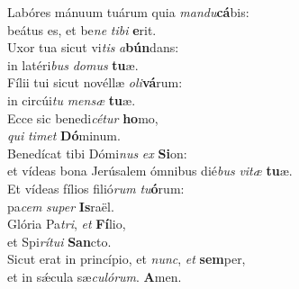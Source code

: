\evenverse Labóres mánuum tuárum quia \textit{man}\textit{du}\textbf{cá}bis:~\*\\
\evenverse beátus es, et be\textit{ne} \textit{ti}\textit{bi} \textbf{e}rit.\\
\oddverse Uxor tua sicut vi\textit{tis} \textit{a}\textbf{bún}dans:~\*\\
\oddverse in latéri\textit{bus} \textit{do}\textit{mus} \textbf{tu}æ.\\
\evenverse Fílii tui sicut novéllæ \textit{o}\textit{li}\textbf{vá}rum:~\*\\
\evenverse in circúi\textit{tu} \textit{men}\textit{sæ} \textbf{tu}æ.\\
\oddverse Ecce sic benedi\textit{cé}\textit{tur} \textbf{ho}mo,~\*\\
\oddverse \textit{qui} \textit{ti}\textit{met} \textbf{Dó}minum.\\
\evenverse Benedícat tibi Dómi\textit{nus} \textit{ex} \textbf{Si}on:~\*\\
\evenverse et vídeas bona Jerúsalem ómnibus dié\textit{bus} \textit{vi}\textit{tæ} \textbf{tu}æ.\\
\oddverse Et vídeas fílios filió\textit{rum} \textit{tu}\textbf{ó}rum:~\*\\
\oddverse pa\textit{cem} \textit{su}\textit{per} \textbf{Is}raël.\\
\evenverse Glória Pa\textit{tri}, \textit{et} \textbf{Fí}lio,~\*\\
\evenverse et Spi\textit{rí}\textit{tu}\textit{i} \textbf{San}cto.\\
\oddverse Sicut erat in princípio, et \textit{nunc}, \textit{et} \textbf{sem}per,~\*\\
\oddverse et in sǽcula sæ\textit{cu}\textit{ló}\textit{rum}. \textbf{A}men.\\
